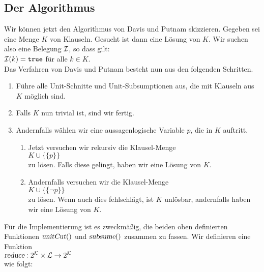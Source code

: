 \subsection{Der Algorithmus}
Wir k\"{o}nnen jetzt den Algorithmus von Davis und Putnam skizzieren.
Gegeben sei eine Menge $K$ von Klauseln.  Gesucht ist dann eine L\"{o}sung von $K$.  Wir
suchen  also eine Belegung $\mathcal{I}$, so dass gilt: \\[0.2cm]
\hspace*{1.3cm} $\mathcal{I}(k) = \texttt{true}$ \quad f\"{u}r alle $k \in K$.\\[0.2cm]
Das Verfahren von Davis und Putnam besteht nun aus den folgenden Schritten.
\begin{enumerate}
\item F\"{u}hre alle Unit-Schnitte und Unit-Subsumptionen aus, die mit Klauseln aus $K$ m\"{o}glich sind.
\item Falls $K$ nun trivial ist, sind wir fertig.
\item Andernfalls w\"{a}hlen wir eine aussagenlogische Variable $p$, die in $K$ auftritt.
      \begin{enumerate}
      \item Jetzt versuchen  wir rekursiv  die Klausel-Menge \\[0.2cm]
            \hspace*{1.3cm}  $K \cup \bigl\{\{p\}\bigr\}$ \\[0.2cm]
            zu l\"{o}sen. Falls diese gelingt, haben wir eine L\"{o}sung von $K$.
      \item Andernfalls versuchen wir  die Klausel-Menge \\[0.2cm]
            \hspace*{1.3cm} $K \cup \bigl\{\{\neg p\}\bigr\}$ \\[0.2cm]
            zu l\"{o}sen.  Wenn auch dies fehlschl\"{a}gt, ist $K$ unl\"{o}sbar, andernfalls
            haben wir eine L\"{o}sung von $K$.
      \end{enumerate}
\end{enumerate}
F\"{u}r die Implementierung ist es zweckm\"{a}\ss{}ig, die beiden oben definierten Funktionen $\textsl{unitCut}()$ und
$\textsl{subsume}()$ zusammen zu fassen.  Wir definieren eine Funktion
\\[0.2cm]
\hspace*{1.3cm}
$\textsl{reduce}: 2^\mathcal{K} \times \mathcal{L} \rightarrow 2^\mathcal{K}$
\\[0.2cm]
wie folgt: 
\\[0.2cm]
\hspace*{1.3cm}
